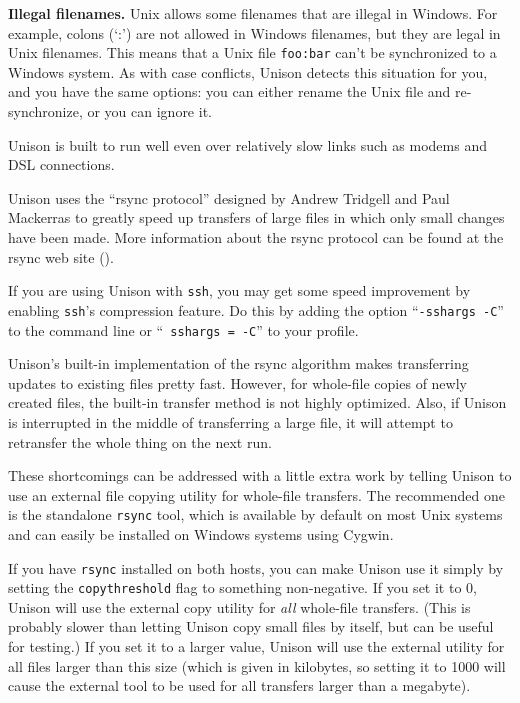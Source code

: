 \documentclass{article}
\begin{document}
\textbf{Illegal filenames.}  Unix allows some filenames that are
illegal in Windows.  For example, colons (`:') are not allowed in
Windows filenames, but they are legal in Unix filenames.  This means
that a Unix file \texttt{foo:bar} can't be synchronized to a Windows
system.  As with case conflicts, Unison detects this situation for
you, and you have the same options: you can either rename the Unix
file and re-synchronize, or you can ignore it.



Unison is built to run well even over relatively slow links such as
modems and DSL connections.

Unison uses the ``rsync protocol'' designed by Andrew Tridgell and Paul
Mackerras to greatly speed up transfers of large files in which only
small changes have been made.  More information about the rsync protocol
can be found at the rsync web site ().

If you are using Unison with {\tt ssh}, you may get some speed
improvement by enabling {\tt ssh}'s compression feature.  Do this by
adding the option ``{\tt -sshargs -C}'' to the command line or ``{\tt
  sshargs = -C}'' to your profile.



Unison's built-in implementation of the rsync algorithm makes transferring
updates to existing files pretty fast.  However, for whole-file copies of
newly created files, the built-in transfer method is not highly optimized.
Also, if Unison is interrupted in the middle of transferring a large file,
it will attempt to retransfer the whole thing on the next run.

These shortcomings can be addressed with a little extra work by telling
Unison to use an external file copying utility for whole-file transfers.
The recommended one is the standalone {\tt rsync} tool, which is available
by default on most Unix systems and can easily be installed on Windows
systems using Cygwin.

If you have {\tt rsync} installed on both hosts, you can make Unison use it
simply by setting the {\tt copythreshold} flag to something non-negative.
If you set it to 0, Unison will use the external copy utility for {\em all}
whole-file transfers.  (This is probably slower than letting Unison copy
small files by itself, but can be useful for testing.)  If you set it to a
larger value, Unison will use the external utility for all files larger than
this size (which is given in kilobytes, so setting it to 1000 will cause the
external tool to be used for all transfers larger than a megabyte).
\end{document}
